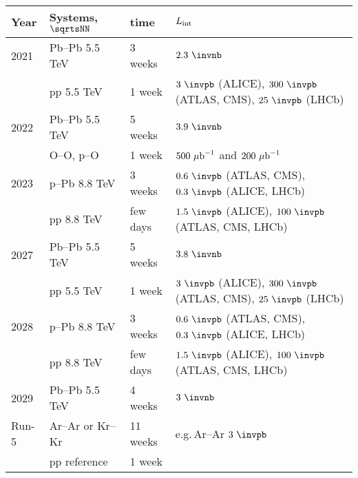 \documentclass[../report.tex]{subfiles}
\begin{document}
\begin{table}[!h]
\begin{center}
\begin{tabular}{llll}
Year & Systems, $\sqrtsNN$ & time & $L_{\rm int}$ \\
\hline
2021 &  Pb--Pb 5.5 TeV & 3 weeks & $2.3~\invnb$ \\
     &  pp 5.5 TeV & 1 week & $3~\invpb$ (ALICE), $300~\invpb$ (ATLAS, CMS), $25~\invpb$ (LHCb)  \\
\hline
2022 &  Pb--Pb 5.5 TeV & 5 weeks & $3.9~\invnb$ \\
     &  O--O, p--O & 1 week & $500~{\rm \mu b}^{-1}$ and $200~{\rm \mu b}^{-1}$ \\
\hline
2023 &  p--Pb 8.8 TeV & 3 weeks & $0.6~\invpb$ (ATLAS, CMS), $0.3~\invpb$ (ALICE, LHCb) \\
     &  pp 8.8 TeV & few days & $1.5~\invpb$ (ALICE), $100~\invpb$ (ATLAS, CMS, LHCb)  \\
\hline
2027 &  Pb--Pb 5.5 TeV & 5 weeks & $3.8~\invnb$ \\
     &  pp 5.5 TeV & 1 week & $3~\invpb$ (ALICE), $300~\invpb$ (ATLAS, CMS), $25~\invpb$ (LHCb)  \\
\hline
2028 &  p--Pb 8.8 TeV & 3 weeks & $0.6~\invpb$ (ATLAS, CMS), $0.3~\invpb$ (ALICE, LHCb) \\
     &  pp 8.8 TeV & few days & $1.5~\invpb$ (ALICE), $100~\invpb$ (ATLAS, CMS, LHCb)  \\
\hline
2029 &  Pb--Pb 5.5 TeV & 4 weeks & $3~\invnb$ \\
\hline
Run-5 &  Ar--Ar or Kr--Kr & 11 weeks & e.g.\,Ar--Ar $3~\invpb$ \\
     &  pp reference & 1 week & \\
\hline
\end{tabular}
\end{center}
\end{table}
\end{document}
